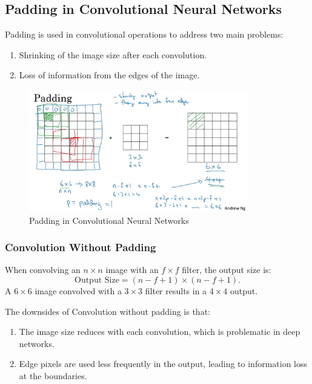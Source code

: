 \documentclass[letterpaper,12pt,notitlepage,twoside]{report}
\begin{document}
\subsection{Padding in Convolutional Neural Networks}

Padding is used in convolutional operations to address two main problems:
\begin{enumerate}
    \item Shrinking of the image size after each convolution.
    \item Loss of information from the edges of the image.
\end{enumerate}

\begin{figure}[h]
	\centering
	\includegraphics[width=0.85\textwidth]{Images/Padding.png}
	\caption{Padding in Convolutional Neural Networks}
	\label{fig:23}
\end{figure}
\FloatBarrier

\subsubsection*{Convolution Without Padding}
When convolving an \(n \times n\) image with an \(f \times f\) filter, the output size is:
\[
\text{Output Size} = (n - f + 1) \times (n - f + 1).
\]
A \(6 \times 6\) image convolved with a \(3 \times 3\) filter results in a \(4 \times 4\) output.

The downsides of Convolution without padding is that:
\begin{enumerate}[nosep]
    \item The image size reduces with each convolution, which is problematic in deep networks.
    \item Edge pixels are used less frequently in the output, leading to information loss at the boundaries.
\end{enumerate}
\end{document}

